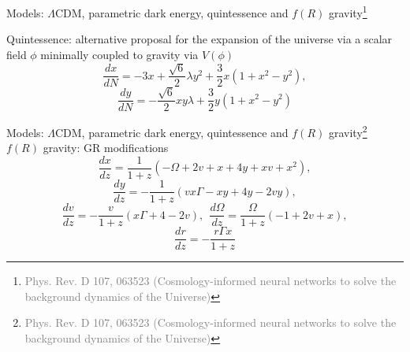 \documentclass[aspectratio=169, 12pt]{beamer}
\newcommand{\gray}[1]{\textcolor{gray}{#1}}
\begin{document}
\begin{frame}{Models: \alert{$\Lambda$CDM}, \alert{parametric dark energy}, \alert{quintessence}  and \alert{$f(R)$ gravity}\footnote{\tiny{\gray{Phys. Rev. D 107, 063523 (Cosmology-informed neural networks to solve the background dynamics of the Universe)}}}}

\alert{Quintessence:} alternative proposal for the expansion of the universe via a scalar field $\phi$ minimally coupled to gravity via $V(\phi)$\pause
\begin{displaymath}
  \frac{dx}{dN} = -3x+\frac{\sqrt{6}}{2}\lambda y^2 + \frac{3}{2}x\left( 1+x^2-y^2\right),
\end{displaymath}
\begin{displaymath}
  \frac{dy}{dN} = -\frac{
  \sqrt{6}}{2}xy\lambda + \frac{3}{2}y\left(1+x^2-y^2\right)
\end{displaymath}
\end{frame}
\begin{frame}{Models: \alert{$\Lambda$CDM}, \alert{parametric dark energy}, \alert{quintessence}  and \alert{$f(R)$ gravity}\footnote{\tiny{\gray{Phys. Rev. D 107, 063523 (Cosmology-informed neural networks to solve the background dynamics of the Universe)}}}}
\alert{$f(R)$ gravity:} GR modifications\pause
\begin{displaymath}
  \frac{dx}{dz} = \frac{1}{1+z}\left( -\Omega + 2v + x + 4y + xv + x^2\right),
\end{displaymath}
\begin{displaymath}
  \frac{dy}{dz} = -\frac{1}{1+z}\left( vx\Gamma - xy + 4y - 2vy\right),
\end{displaymath}
\begin{displaymath}
  \frac{dv}{dz} = -\frac{v}{1+z}\left( x\Gamma + 4 -2v\right),\ \ \frac{d\Omega}{dz} = \frac{\Omega}{1+z}\left(-1 + 2v + x\right),
\end{displaymath}
\begin{displaymath}
  \frac{dr}{dz} = -\frac{r\Gamma x}{1+z}
\end{displaymath}
\end{frame}
\end{document}
